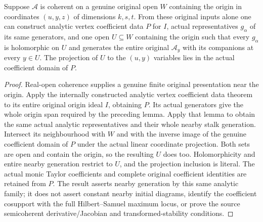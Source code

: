 \begin{theorem}
\label{hir:actual-original-nearby-monic-vertex-generators}
\leanok
Suppose $\mathcal A$ is coherent on a genuine original open $W$ containing
the origin in coordinates $(u,y,z)$ of dimensions $k,s,t$.
From these original inputs alone one can construct analytic vertex
coefficient data $P$ for $I$, actual representatives $g_\alpha$ of its same
generators, and one open $U\subseteq W$ containing the origin such that
every $g_\alpha$ is holomorphic on $U$ and generates the entire original
$\mathcal A_y$ with its companions at every $y\in U$.
The projection of $U$ to the $(u,y)$ variables lies in the actual coefficient
domain of $P$.
\end{theorem}
\begin{proof}
Real-open coherence supplies a genuine finite original presentation near
the origin. Apply the internally constructed analytic vertex coefficient
data theorem to its entire original origin ideal $I$, obtaining $P$.
Its actual generators give the whole origin span required by the preceding
lemma. Apply that lemma to obtain the same actual analytic representatives
and their whole nearby stalk generation. Intersect its neighbourhood with
$W$ and with the inverse image of the genuine coefficient domain of $P$
under the actual linear coordinate projection. Both sets are open and
contain the origin, so the resulting $U$ does too. Holomorphicity and
entire nearby generation restrict to $U$, and the projection inclusion is
literal. The actual monic Taylor coefficients and complete original
coefficient identities are retained from $P$.
The result asserts nearby generation by this same analytic family; it
does not assert constant nearby initial diagrams, identify the coefficient
cosupport with the full Hilbert--Samuel maximum locus, or prove the source
semicoherent derivative/Jacobian and transformed-stability conditions.
\end{proof}
